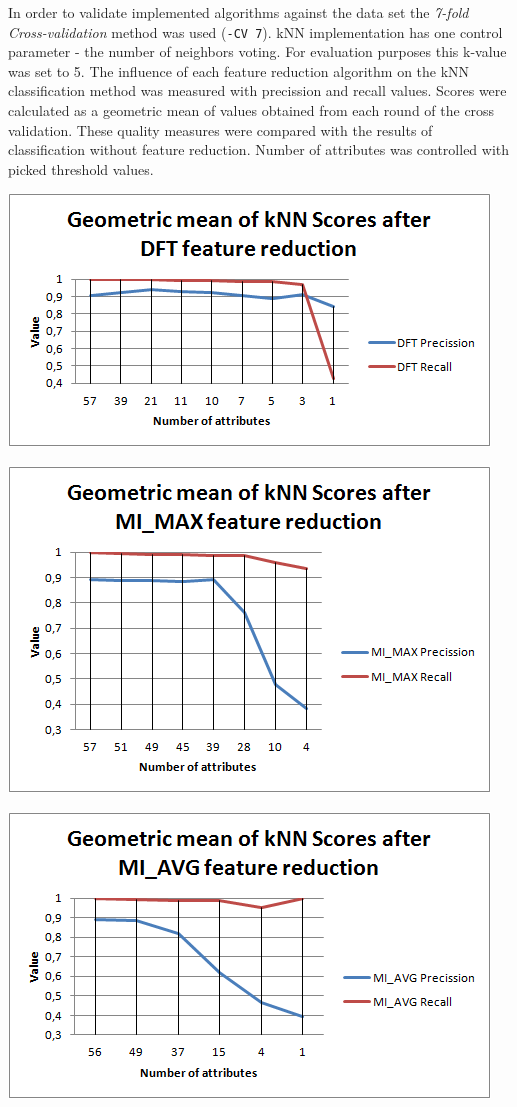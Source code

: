 \documentclass[12pt,a4paper]{report}
\begin{document}
In order to validate implemented algorithms against the data set the \emph{7-fold Cross-validation} method was used (\texttt{-CV 7}). kNN implementation has one control parameter - the number of neighbors voting. For evaluation purposes this k-value was set to 5.
The influence of each feature reduction algorithm on the kNN classification method was measured with precission and recall values. Scores were calculated as a geometric mean of values obtained from each round of the cross validation.  These quality measures were compared with the results of classification without feature reduction. Number of attributes was controlled with picked threshold values.

\includegraphics[scale=1]{DFTscores}

\includegraphics[scale=1]{MIMAXscores}

\includegraphics[scale=1]{MIAVGscores}
\end{document}
